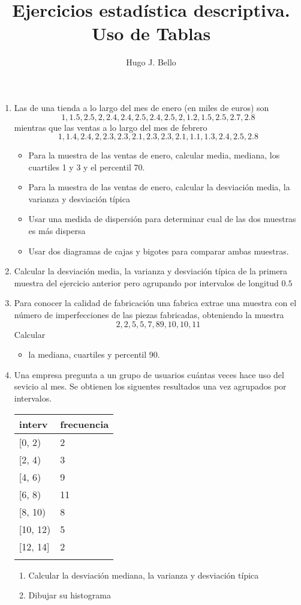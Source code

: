 \documentclass[
]{article}
\title{Ejercicios estadística descriptiva. Uso de Tablas}
\author{Hugo J. Bello}
\date{}
\providecommand{\tightlist}{%
  \setlength{\itemsep}{0pt}\setlength{\parskip}{0pt}}
\begin{document}
\maketitle

\begin{enumerate}
\def\labelenumi{\arabic{enumi}.}
\item
  Las de una tienda a lo largo del mes de enero (en miles de euros) son
  \[1, 1.5, 2.5, 2, 2.4, 2.4, 2.5, 2.4, 2.5, 2, 1.2, 1.5, 2.5, 2.7, 2.8\]
  mientras que las ventas a lo largo del mes de febrero
  \[1, 1.4, 2.4, 2, 2.3, 2.3, 2.1, 2.3, 2.3, 2.1, 1.1, 1.3, 2.4, 2.5, 2.8\]

  \begin{itemize}
  \tightlist
  \item
    Para la muestra de las ventas de enero, calcular media, mediana, los
    cuartiles 1 y 3 y el percentil 70.
  \item
    Para la muestra de las ventas de enero, calcular la desviación
    media, la varianza y desviación típica
  \item
    Usar una medida de dispersión para determinar cual de las dos
    muestras es más dispersa
  \item
    Usar dos diagramas de cajas y bigotes para comparar ambas muestras.
  \end{itemize}
\item
  Calcular la desviación media, la varianza y desviación típica de la
  primera muestra del ejercicio anterior pero agrupando por intervalos
  de longitud \(0.5\)
\item
  Para conocer la calidad de fabricación una fabrica extrae una muestra
  con el número de imperfecciones de las piezas fabricadas, obteniendo
  la muestra \[2, 2, 5, 5, 7,8 9, 10, 10, 11\] Calcular

  \begin{itemize}
  \tightlist
  \item
    la mediana, cuartiles y percentil 90.
  \end{itemize}
\item
  Una empresa pregunta a un grupo de usuarios cuántas veces hace uso del
  sevicio al mes. Se obtienen los siguentes resultados una vez agrupados
  por intervalos.

  \begin{longtable}[]{@{}ll@{}}
  \toprule
  interv & frecuencia\tabularnewline
  \midrule
  \endhead
  {[}0, 2) & 2\tabularnewline
  {[}2, 4) & 3\tabularnewline
  {[}4, 6) & 9\tabularnewline
  {[}6, 8) & 11\tabularnewline
  {[}8, 10) & 8\tabularnewline
  {[}10, 12) & 5\tabularnewline
  {[}12, 14{]} & 2\tabularnewline
  &\tabularnewline
  \bottomrule
  \end{longtable}

  \begin{enumerate}
  \def\labelenumii{\arabic{enumii}.}
  \item
    Calcular la desviación mediana, la varianza y desviación típica
  \item
    Dibujar su histograma
  \end{enumerate}
\end{enumerate}
\end{document}
